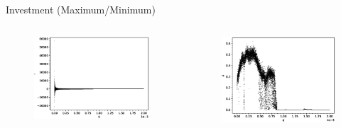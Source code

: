 \documentclass{beamer}
\begin{document}
\begin{frame}{Investment (Maximum/Minimum)}
	\begin{columns}
	\begin{column}{0.5\textwidth}
		\begin{figure}
			\centering
			\includegraphics[width=1.2\textwidth]{qbifurcation.eps}
		\end{figure}
	\end{column}
	\begin{column}{0.5\textwidth}
		\begin{figure}
			\centering
			\includegraphics[width=1.2\textwidth]{qlyplot.eps}
		\end{figure}
	\end{column}
	\end{columns}
\end{frame}
\end{document}
